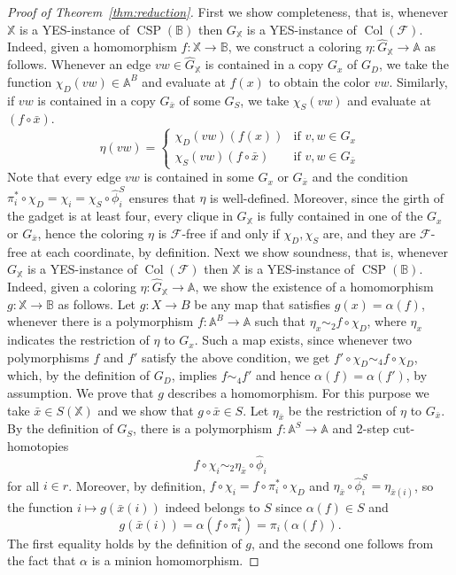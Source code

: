 \documentclass[oneside]{amsart}
\DeclareMathOperator{\col}{Col}
\newcommand{\str}[1]{\mathbb{#1}}
\newcommand{\cat}[1]{\mathcal{#1}}
\newcommand{\CSP}{\operatorname{CSP}}
\begin{document}
\begin{proof}[Proof of Theorem~\ref{thm:reduction}]
First we show completeness, that is, whenever $\str X$ is a YES-instance of $\CSP(\str B)$ then $G_\str X$ is a YES-instance of $\col(\cat F)$. Indeed, given a homomorphism $f\colon \str X\to \str B$, we  construct a coloring $\eta\colon\hat G_\str X\to \str A$ as follows. 
Whenever an edge $vw\in\hat G_\str X$ is contained in a copy $G_x$ of $G_D$, we take the function $\chi_D(vw)\in \str A^B$ and evaluate at $f(x)$ to obtain the color $vw$. Similarly, if $vw$ is contained in a copy $G_{\bar x}$ of some $G_S$, we take $\chi_S(vw)$ and evaluate at $(f\circ\bar x)$. 
$$
\eta(vw) = 
\begin{cases}
\chi_D(vw)(f(x)) &\text{if } v,w \in G_x  \\
\chi_S(vw)(f\circ \bar x) &\text{if } v,w\in G_{\bar x}
\end{cases}
$$
Note that every edge $vw$ is contained in some $G_x$ or $G_{\bar x}$ and the condition $\pi_i^*\circ\chi_D=\chi_i = \chi_S\circ\hat\phi^S_i$ ensures that $\eta$ is well-defined. Moreover, since the girth of the gadget is at least four, every clique in $G_\str X$ is fully contained in one of the $G_x$ or $G_{\bar x}$, hence the coloring $\eta$ is $\cat F$-free if and only if $\chi_D, \chi_S$ are, and they are $\cat F$-free at each coordinate, by definition.
Next we show soundness, that is, whenever $ G_\str X$ is a YES-instance of $\col(\cat F)$ then $\str X$ is a YES-instance of $\CSP(\str B)$.
Indeed, given a coloring $\eta\colon\hat G_\str X\to \str A$, we show the existence of a homomorphism $g\colon \str X\to \str B$ as follows.
Let $g\colon X\to B$ be any map that satisfies $g(x)=\alpha(f)$, whenever there is a polymorphism $f: \str A^B \rightarrow \str A$ such that $\eta_x\sim_2 f\circ\chi_D$, where $\eta_x$ indicates the restriction of $\eta$ to $G_x$. Such a map exists, since 
whenever two polymorphisms $f$ and $f'$ satisfy the above condition, we get $f'\circ \chi_D \sim_4 f\circ\chi_D$, which, by the definition of $G_D$, implies $f\sim_4 f'$ and hence $\alpha(f)=\alpha(f')$, by assumption.
We prove that $g$ describes a homomorphism. For this purpose we take  $\bar x\in S(\str X)$ and we show that $g\circ\bar x \in S$.
Let $\eta_{\bar x}$ be the restriction of $\eta$ to $G_{\bar x}$.
By the definition of $G_S$, there is a polymorphism $f\colon\str A^S\to\str A$ and 
2-step cut-homotopies 
$$
 f\circ\chi_i\sim_2\eta_{\bar x}\circ\hat\phi_i
$$
for all $i \in r$. Moreover, by definition, $f\circ \chi_i =f\circ\pi_i^*\circ \chi_D$ and $\eta_{\bar x}\circ\hat\phi^S_i = \eta_{\bar x(i)}$, so the function $i\mapsto 
g(\bar x(i))$ indeed belongs to $S$ since $\alpha(f)\in S$ and 
$$
g(\bar x(i)) = 
\alpha(f\circ\pi_i^*)= \pi_i(\alpha(f)).
$$
The first equality holds by the definition of $g$, and the second one follows from the fact that $\alpha$ is a minion homomorphism.
\end{proof}
\end{document}
